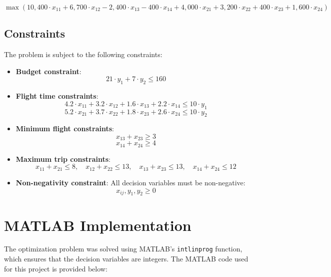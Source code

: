 \documentclass{article}
\begin{document}
\[
\max \left( 10,400 \cdot x_{11} + 6,700 \cdot x_{12} - 2,400 \cdot x_{13} - 400 \cdot x_{14} + 4,000 \cdot x_{21} + 3,200 \cdot x_{22} + 400 \cdot x_{23} + 1,600 \cdot x_{24} \right)
\]

\subsection*{Constraints}
The problem is subject to the following constraints:
\begin{itemize}
    \item \textbf{Budget constraint}: 
    \[
    21 \cdot y_1 + 7 \cdot y_2 \leq 160
    \]
    \item \textbf{Flight time constraints}:
    \[
    4.2 \cdot x_{11} + 3.2 \cdot x_{12} + 1.6 \cdot x_{13} + 2.2 \cdot x_{14} \leq 10 \cdot y_1
    \]
    \[
    5.2 \cdot x_{21} + 3.7 \cdot x_{22} + 1.8 \cdot x_{23} + 2.6 \cdot x_{24} \leq 10 \cdot y_2
    \]
    \item \textbf{Minimum flight constraints}:
    \[
    x_{13} + x_{23} \geq 3
    \]
    \[
    x_{14} + x_{24} \geq 4
    \]
    \item \textbf{Maximum trip constraints}:
    \[
    x_{11} + x_{21} \leq 8, \quad x_{12} + x_{22} \leq 13, \quad x_{13} + x_{23} \leq 13, \quad x_{14} + x_{24} \leq 12
    \]
    \item \textbf{Non-negativity constraint}: 
    All decision variables must be non-negative:
    \[
    x_{ij}, y_1, y_2 \geq 0
    \]
\end{itemize}

\section*{MATLAB Implementation}
The optimization problem was solved using MATLAB's \texttt{intlinprog} function, which ensures that the decision variables are integers. The MATLAB code used for this project is provided below:
\end{document}
